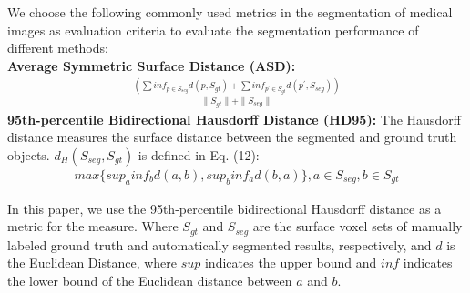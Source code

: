 \documentclass[journal]{IEEEtran}
\begin{document}
We choose the following commonly used metrics in the segmentation of medical images as evaluation criteria to evaluate the segmentation performance of different methods:\\
\textbf{Average Symmetric Surface Distance (ASD):}
\begin{equation}
\begin{aligned}
\frac{( \sum inf_{p \in S_{seg}} d(p,S_{gt})+ \sum inf_{p^{'} \in S_{gt}}d(p^{'},S_{seg}))}{{ \parallel S_{gt} \parallel + \parallel S_{seg} \parallel  }} 
\end{aligned}
\label{f11}
\end{equation}
\textbf{95th-percentile Bidirectional Hausdorff Distance (HD95):}
The Hausdorff distance measures the surface distance between the segmented
and ground truth objects. $d_{H}(S_{seg},S_{gt})$ is defined in Eq. (12):
\begin{equation}
\begin{aligned}
max\{ sup_{a} inf_{b}d(a,b),sup_{b} inf_{a}d(b,a) \},a \in S_{seg}, b \in S_{gt}
\end{aligned}
\label{f12}
\end{equation}

In this paper, we use the 95th-percentile bidirectional Hausdorff distance as a metric for the measure. Where $S_{gt}$ and $S_{seg}$ are the surface voxel sets of manually labeled ground truth and automatically segmented results, respectively, and $d$ is the Euclidean Distance, where $sup$ indicates the upper bound and $inf$ indicates the lower bound of the Euclidean distance between $a$ and $b$. 
\end{document}
